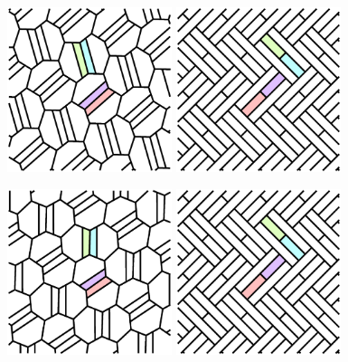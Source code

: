 \documentclass{beamer}
\begin{document}
\begin{frame}
  \begin{center}
    \includegraphics[width=1.9in]{c04}
    \includegraphics[width=1.9in]{c12}
  \end{center}
\end{frame}

\begin{frame}
  \begin{center}
    \includegraphics[width=1.9in]{c05}
    \includegraphics[width=1.9in]{c12}
  \end{center}
\end{frame}
\end{document}
